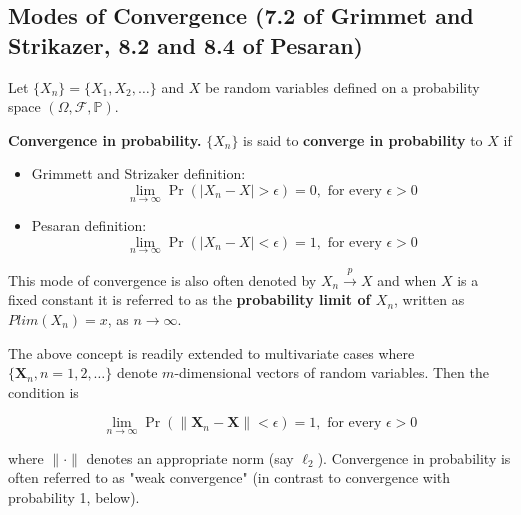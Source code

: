 \subsection{Modes of Convergence (7.2 of Grimmet and Strikazer, 8.2 and 8.4 of Pesaran)}

 Let \(\{X_n\} = \{X_1, X_2, \ldots\}\) and \(X\) be random variables defined on a probability space \((\Omega, \mathcal{F}, \mathbb{P})\).

\begin{definition} \textbf{Convergence in probability.} \(\{X_n\}\) is said to \textbf{converge in probability} to \(X\) if
\begin{itemize}

\item Grimmett and Strizaker definition:
\[
\lim_{n \to \infty} \Pr(|X_n -X| > \epsilon) = 0, \text{ for every } \epsilon > 0
\]

\item Pesaran definition:
\[
\lim_{n \to \infty} \Pr(|X_n -X| < \epsilon) = 1, \text{ for every } \epsilon > 0
\]

\end{itemize}

This mode of convergence is also often denoted by \(X_n \xrightarrow{p} X\) and when \(X\) is a fixed constant it is referred to as the \textbf{probability limit of \(X_n\)}, written as \(Plim(X_n) = x\), as \(n \to \infty\).

The above concept is readily extended to multivariate cases where \(\{ \boldsymbol{X}_n, n = 1, 2, \ldots \}\) denote \(m\)-dimensional vectors of random variables. Then the condition is

\[
\lim_{n \to \infty} \Pr(\lVert \boldsymbol{X}_n -\boldsymbol{X}\rVert  < \epsilon) = 1, \text{ for every } \epsilon > 0
\]

where \(\lVert \cdot \rVert \) denotes an appropriate norm (say \(\ell_2\)). Convergence in probability is often referred to as "weak convergence" (in contrast to convergence with probability 1, below).
\end{definition} 

